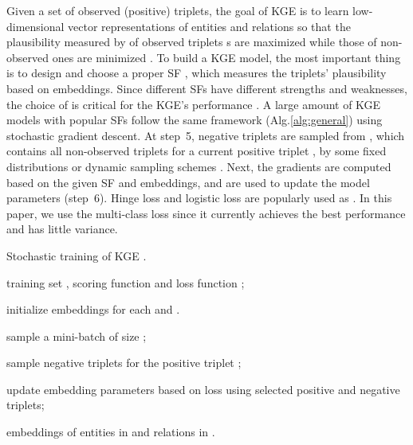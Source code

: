\documentclass[conference]{IEEEtran}
\begin{document}
Given a set of observed (positive) triplets,
the goal of KGE is to learn low-dimensional vector representations of 
entities and relations so that 
the 
plausibility measured by  of observed triplets s
are maximized while those of non-observed ones are minimized \cite{wang2017knowledge}.
To build a KGE model,
the most important thing is to design and choose a proper SF ,
which measures the triplets' plausibility based on embeddings.
Since different SFs have different strengths and weaknesses,
the choice of  is critical for the KGE's performance \cite{wang2017knowledge,lin2018knowledge}.
A large amount of KGE models with popular SFs
follow the same framework (Alg.\ref{alg:general}) \cite{wang2017knowledge}
using stochastic gradient descent.
At step~5,
negative triplets are sampled from ,
which contains all non-observed triplets for a current positive triplet ,
by some fixed distributions \cite{wang2014knowledge} or dynamic sampling schemes \cite{zhang2018nscaching}. 
Next,
the gradients
are computed 
based on the given SF and embeddings,
and
are used to update the model parameters (step~6).
Hinge loss \cite{bordes2013translating} and logistic loss \cite{yang2014embedding} are popularly used as .
In this paper, we use the multi-class loss \cite{lacroix2018canonical}
since it
currently achieves the best performance and has little variance.
 
\begin{algorithm}[ht]
	\caption{Stochastic training of KGE \cite{wang2017knowledge}.}
	\label{alg:general}
	\small
	\begin{algorithmic}[1]
		\REQUIRE training set , scoring function  and loss function ;
		
		\STATE initialize embeddings  for each  and .
		\FOR{}
		
		\STATE sample a mini-batch  of size ;
		
		\STATE  sample  negative triplets 
		for the positive triplet ; 
		
		\STATE update embedding parameters based on loss  using selected positive and negative triplets;
		
		\ENDFOR
		\ENDFOR
		\RETURN embeddings of entities in  and relations in .
	\end{algorithmic}
\end{algorithm} 
\end{document}
